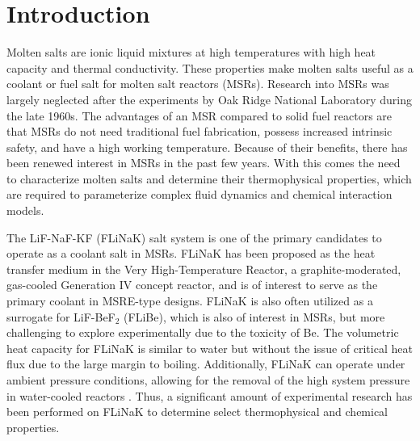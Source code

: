 \documentclass[preprint,12pt]{elsarticle}
\begin{document}
\linenumbers


\section{Introduction}
\label{sec:sample1}


Molten salts are ionic liquid mixtures at high temperatures with high heat capacity and thermal conductivity. These properties make molten salts useful as a coolant or fuel salt for molten salt reactors (MSRs). Research into MSRs was largely neglected after the experiments by Oak Ridge National Laboratory during the late 1960s\cite{Porter2022}. The advantages of an MSR compared to solid fuel reactors are that MSRs do not need traditional fuel fabrication, possess increased intrinsic safety, and have a high working temperature\cite{MSROverview}. Because of their benefits, there has been renewed interest in MSRs in the past few years. With this comes the need to characterize molten salts and determine their thermophysical properties, which are required to parameterize complex fluid dynamics and chemical interaction models\cite{Porter2022,freile2019}.


The LiF-NaF-KF (FLiNaK) salt system is one of the primary candidates to operate as a coolant salt in MSRs. FLiNaK has been proposed as the heat transfer medium in the Very High-Temperature Reactor, a graphite-moderated, gas-cooled Generation IV concept reactor\cite{Benes2009}, and is of interest to serve as the primary coolant in MSRE-type designs. FLiNaK is also often utilized as a surrogate for LiF-BeF$_2$ (FLiBe), which is also of interest in MSRs, but more challenging to explore experimentally due to the toxicity of Be. The volumetric heat capacity for FLiNaK is similar to water but without the issue of critical heat flux due to the large margin to boiling. Additionally, FLiNaK can operate under ambient pressure conditions, allowing for the removal of the high system pressure in water-cooled reactors \cite{Ambrosek2009}. Thus, a significant amount of experimental research has been performed on FLiNaK to determine select thermophysical and chemical properties.  
\end{document}
